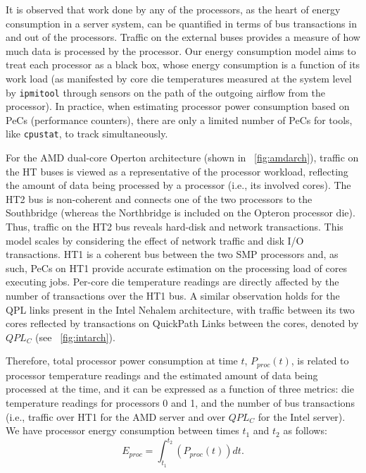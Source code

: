It is observed that work done by any of the processors, as the heart of
energy consumption in a server system, can be quantified in terms of bus
transactions in and out of the processors.  Traffic on the external
buses provides a measure of how much data is processed by the processor.
Our energy consumption model aims to treat each processor as a black
box, whose energy consumption is a function of its work load (as
manifested by core die temperatures measured at the system level by
\texttt{ipmitool} through sensors on the path of the outgoing airflow
from the processor).  In practice, when estimating processor power
consumption based on PeCs (performance counters), there are only a
limited number of PeCs for tools, like \texttt{cpustat}, to track simultaneously.

For the AMD dual-core Operton architecture (shown in
\figurename~\ref{fig:amdarch}), traffic on the HT buses is viewed as a
representative of the processor workload, reflecting the amount of data
being processed by a processor (i.e., its involved cores).  The HT2 bus
is non-coherent and connects one of the two processors to the
Southbridge (whereas the Northbridge is included on the Opteron
processor die).  Thus, traffic on the HT2 bus reveals hard-disk and
network transactions.  This model scales by considering the effect of
network traffic and disk I/O transactions.  HT1 is a coherent bus
between the two SMP processors and, as such, PeCs on HT1 provide
accurate estimation on the processing load of cores executing jobs.
Per-core die temperature readings are directly affected by the number of
transactions over the HT1 bus.  A similar observation holds for the QPL
links present in the Intel Nehalem architecture, with traffic between
its two cores reflected by transactions on QuickPath Links between the
cores, denoted by $QPL_C$ (see \figurename~\ref{fig:intarch}).

Therefore, total processor power consumption at time $t$, $P_{proc}(t)$,
is related to processor temperature readings and the estimated amount of
data being processed at the time, and it can be expressed as a function
of three metrics: die temperature readings for processors 0 and 1, and
the number of bus transactions (i.e., traffic over HT1 for the AMD
server and over $QPL_C$ for the Intel server).  We have processor energy
consumption between times $t_{1}$ and $t_{2}$ as follows:
\begin{equation}
  \label{eq:procpwr2}
  E_{proc}=\displaystyle\int_{t_{1}}^{t_{2}}\left( {P_{proc}(t)} \right)dt.
\end{equation}
